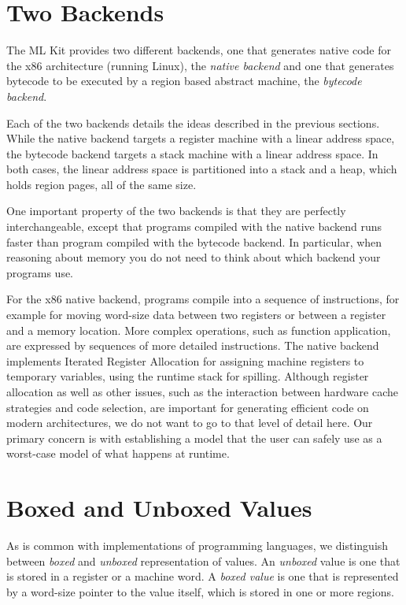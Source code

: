 \documentclass[12pt]{book}
\begin{document}
\section{Two Backends}
%
%
The ML Kit provides two different backends, one that generates native
code for the x86 architecture (running Linux), the {\em native
  backend\/} and one that generates bytecode to be executed by a
region based abstract machine, the {\em bytecode backend}.

Each of the two backends details the ideas described in the previous
sections. While the native backend targets a register machine with a
linear address space, the bytecode backend targets a stack machine
with a linear address space. In both cases, the linear address space
is partitioned into a stack and a heap, which holds region pages, all
of the same size.

One important property of the two backends is that they are perfectly
interchangeable, except that programs compiled with the native backend
runs faster than program compiled with the bytecode backend. In
particular, when reasoning about memory you do not need to think about
which backend your programs use.

For the x86 native backend, programs compile into a sequence of
instructions, for example for moving word-size data between two
registers or between a register and a memory location.  More complex
operations, such as function application, are expressed by sequences
of more detailed instructions. The native backend implements Iterated
Register Allocation \cite{appel96} for assigning machine registers to
temporary variables, using the runtime stack for spilling.  Although
register allocation as well as other issues, such as the interaction
between hardware cache strategies and code selection, are important
for generating efficient code on modern architectures, we do not 
want to go to that level of detail here. Our primary concern is with
establishing a model that the user can safely use as a worst-case
model of what happens at runtime.

\section{Boxed and Unboxed Values}
\label{boxing.sec}
%
%
%
As is common with implementations of programming languages, we
distinguish between {\em boxed\/} and {\em unboxed\/} representation
of values.  An {\em unboxed\/} value is one that is stored in a
register or a machine word. A {\em boxed value\/} is one that is
represented by a word-size pointer to the value itself, which is
stored in one or more regions.
\end{document}
